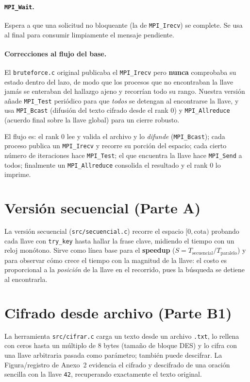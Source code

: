 \documentclass[11pt]{article}
\begin{document}
\paragraph{\texttt{MPI\_Wait}.} Espera a que una solicitud no bloqueante (la de \texttt{MPI\_Irecv})
se complete. Se usa al final para consumir limpiamente el mensaje pendiente.

\paragraph{Correcciones al flujo del base.} El \texttt{bruteforce.c} original publicaba el
\texttt{MPI\_Irecv} pero \textbf{nunca} comprobaba su estado dentro del lazo, de modo que los procesos
que no encontraban la llave jamás se enteraban del hallazgo ajeno y recorrían todo su rango. Nuestra
versión añade \texttt{MPI\_Test} periódico para que \emph{todos} se detengan al encontrarse la llave, y
usa \texttt{MPI\_Bcast} (difusión del texto cifrado desde el rank 0) y \texttt{MPI\_Allreduce} (acuerdo
final sobre la llave global) para un cierre robusto.

El flujo es: el rank 0 lee y valida el archivo y lo \emph{difunde} (\texttt{MPI\_Bcast}); cada proceso
publica un \texttt{MPI\_Irecv} y recorre su porción del espacio; cada cierto número de iteraciones hace
\texttt{MPI\_Test}; el que encuentra la llave hace \texttt{MPI\_Send} a todos; finalmente un
\texttt{MPI\_Allreduce} consolida el resultado y el rank 0 lo imprime.

\section{Versión secuencial (Parte A)}
La versión secuencial (\texttt{src/secuencial.c}) recorre el espacio $[0,\text{cota})$ probando cada
llave con \texttt{try\_key} hasta hallar la frase clave, midiendo el tiempo con un reloj monótono. Sirve
como línea base para el \textbf{speedup} ($S = T_\text{secuencial}/T_\text{paralelo}$) y para observar
cómo crece el tiempo con la magnitud de la llave: el costo es proporcional a la \emph{posición} de la
llave en el recorrido, pues la búsqueda se detiene al encontrarla.

\section{Cifrado desde archivo (Parte B1)}
La herramienta \texttt{src/cifrar.c} carga un texto desde un archivo \texttt{.txt}, lo rellena con ceros
hasta un múltiplo de 8 bytes (tamaño de bloque DES) y lo cifra con una llave arbitraria pasada como
parámetro; también puede descifrar. La Figura/registro de Anexo~2 evidencia el cifrado y descifrado de
una oración sencilla con la llave \texttt{42}, recuperando exactamente el texto original.
\end{document}
